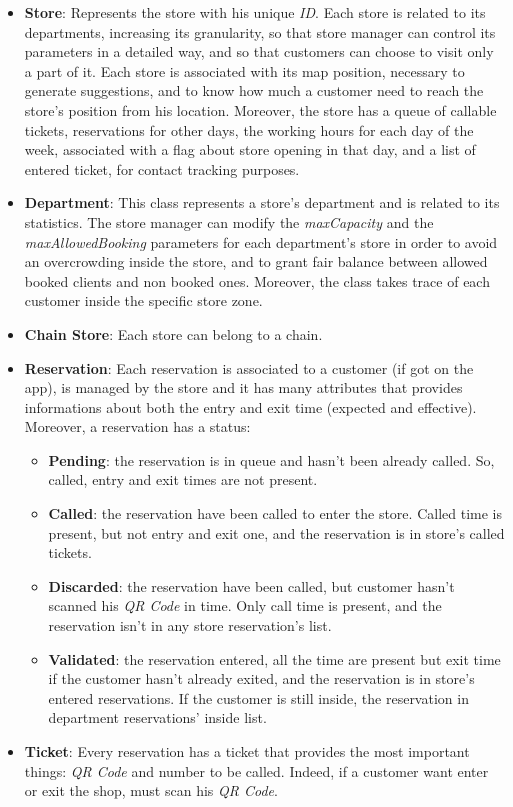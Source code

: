 \documentclass{article}
\begin{document}
\begin{itemize}
\begin{itemize}
				\end{itemize}
			
				\item {\bfseries Store}: Represents the store with his unique \emph{ID}. Each store is related to its departments, increasing its granularity, so that store manager can control its parameters in a detailed way, and so that customers can choose to visit only a part of it. Each store is associated with its map position, necessary to generate suggestions, and to know how much a customer need to reach the store's position from his location. Moreover, the store has a  queue of callable tickets, reservations for other days, the working hours for each day of the week, associated with a flag about store opening in that day, and a list of entered ticket, for contact tracking purposes.
				
				\item {\bfseries Department}: This class represents a store's department and is related to its statistics. The store manager can modify the \emph{maxCapacity} and the \emph{maxAllowedBooking} parameters for each department's store in order to avoid an overcrowding inside the store, and to grant fair balance between allowed booked clients and non booked ones. Moreover, the class takes trace of each customer inside the specific store zone.
				
				\item {\bfseries Chain Store}: Each store can belong to a chain.
				\newpage
				\item {\bfseries Reservation}: Each reservation is associated to a customer (if got on the app), is managed by the store and it has many attributes that provides informations about both the entry and exit time (expected and effective). Moreover, a reservation has a status:
				\begin{itemize}
					\item {\bfseries Pending}: the reservation is in queue and hasn't been already called. So, called, entry and exit times are not present.
					\item {\bfseries Called}: the reservation have been called to enter the store. Called time is present, but not entry and exit one, and the reservation is in store's called tickets.
					\item {\bfseries Discarded}: the reservation have been called, but customer hasn't scanned his \emph{QR Code} in time. Only call time is present, and the reservation isn't in any store reservation's list.
					\item {\bfseries Validated}: the reservation entered, all the time are present but exit time if the customer hasn't already exited, and the reservation is in store's entered reservations. If the customer is still inside, the reservation in department reservations' inside list.
				\end{itemize}
				
				\item {\bfseries Ticket}: Every reservation has a ticket that provides the most important things: \emph{QR Code} and number to be called. Indeed, if a customer want enter or exit the shop, must scan his \emph{QR Code}.
			\end{itemize}
		
\end{document}

